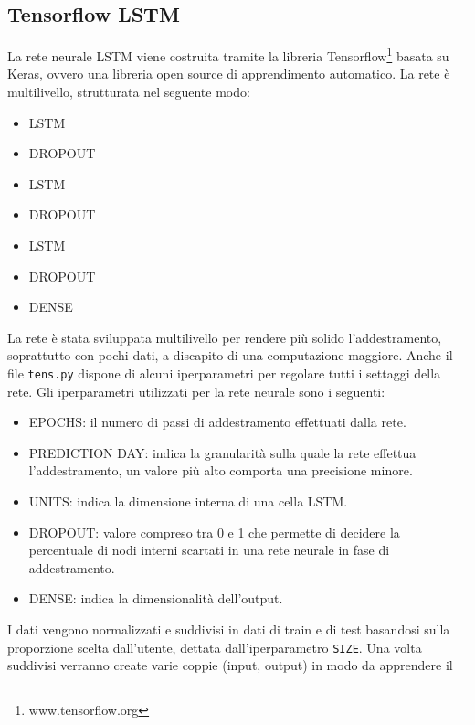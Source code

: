 \documentclass[a4paper,12pt]{article}
\begin{document}
        \subsection{Tensorflow LSTM}La rete neurale LSTM viene costruita 
        tramite la libreria Tensorflow\footnote[6]{www.tensorflow.org} 
        basata su Keras, ovvero una libreria open source di apprendimento 
        automatico. La rete è multilivello, strutturata nel seguente modo:
        \begin{itemize}
            \item LSTM
            \item DROPOUT
            \item LSTM
            \item DROPOUT
            \item LSTM
            \item DROPOUT
            \item DENSE
        \end{itemize}
        La rete è stata sviluppata multilivello per rendere più solido 
        l'addestramento, soprattutto con pochi dati, a discapito di una
        computazione maggiore. Anche il file \lstinline|tens.py| dispone
        di alcuni iperparametri per regolare tutti i settaggi della rete.
        Gli iperparametri utilizzati per la rete neurale sono i seguenti:
        \begin{itemize}
            \item EPOCHS: il numero di passi di addestramento effettuati 
            dalla rete.
            \item PREDICTION DAY: indica la granularità sulla quale la rete
            effettua l'addestramento, un valore più alto comporta una 
            precisione minore.
            \item UNITS: indica la dimensione interna di una cella LSTM.
            \item DROPOUT: valore compreso tra 0 e 1 che permette di 
            decidere la percentuale di nodi interni scartati in una rete 
            neurale in fase di addestramento.
            \item DENSE: indica la dimensionalità dell'output.
        \end{itemize}
        I dati vengono normalizzati e suddivisi in dati di train e di test
        basandosi sulla proporzione scelta dall'utente, dettata
        dall'iperparametro \lstinline|SIZE|. Una volta suddivisi verranno
        create varie coppie (input, output) in modo da apprendere il 
\end{document}
